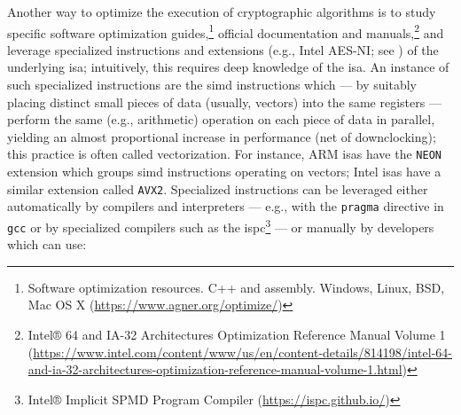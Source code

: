 Another way to optimize the execution of cryptographic algorithms is to study specific software optimization guides,\footnote{Software optimization resources. C++ and assembly. Windows, Linux, BSD, Mac OS X (\url{https://www.agner.org/optimize/})} official documentation and manuals,\footnote{Intel® 64 and IA-32 Architectures Optimization Reference Manual Volume 1 (\url{https://www.intel.com/content/www/us/en/content-details/814198/intel-64-and-ia-32-architectures-optimization-reference-manual-volume-1.html})} and leverage specialized instructions and extensions (e.g., Intel AES-NI; see ) of the underlying \gls{isa}; intuitively, this requires deep knowledge of the \gls{isa}. An instance of such specialized instructions are the \gls{simd} instructions which --- by suitably placing distinct small pieces of data (usually, vectors) into the same registers --- perform the same (e.g., arithmetic) operation on each piece of data in parallel, yielding an almost proportional increase in performance (net of downclocking); this practice is often called vectorization. For instance, ARM \glspl{isa} have the \texttt{NEON} extension which groups \gls{simd} instructions operating on vectors; Intel \glspl{isa} have a similar extension called \texttt{AVX2}. Specialized instructions can be leveraged either automatically by compilers and interpreters --- e.g., with the \texttt{pragma} directive in \texttt{gcc} or by specialized compilers such as the \gls{ispc}\footnote{Intel® Implicit SPMD Program Compiler (\url{https://ispc.github.io/})} --- or manually by developers which can use:

